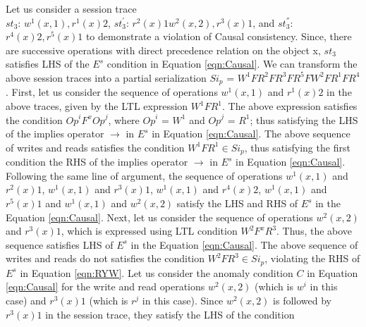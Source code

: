 \documentclass{sig-alternate-05-2015}
\begin{document}
 \par Let us consider a session trace \\ $\mathit{st}_3$: $w^1(x,1), r^1(x){2}$, $\mathit{st}_3^{'}$: $r^2(x){1} w^2(x,2), r^3(x){1}$, and $\mathit{st}_3^{''}$: $r^4(x){2}, r^5(x){1}$ to demonstrate
 a violation of Causal consistency. Since, there are successive operations with direct precedence relation on the object x, $\mathit{st}_3$
 satisfies LHS of the $E^s$ condition in Equation \ref{eqn:Causal}.  We can transform
 the above session traces into a partial serialization $\mathit{Si}_p$ =
 $W^1 F R^2 F R^3 F R^5 F W^2 F R^1 F R^4$. First, let us consider the sequence of operations
 $w^1(x,1)$ and $r^1(x){2}$ in the above traces, given by the LTL expression $W^1 F R^1$. The above expression satisfies
 the condition $\mathit{Op}^i F^x \mathit{Op}^j$, where $\mathit{Op}^i$ = $W^1$ and $\mathit{Op}^j$ = $R^1$;
 thus satisfying the LHS of the implies operator $\rightarrow$ in $E^s$ in Equation \ref{eqn:Causal}. The above sequence of
 writes and reads satisfies the condition $W^1 F R^1 \in \mathit{Si}_p$, thus satisfying the first condition the RHS of
 the implies operator $\rightarrow$ in $E^s$ in Equation \ref{eqn:Causal}.
 Following the same line of argument, the sequence of operations
  $w^1(x,1)$ and $r^2(x){1}$, $w^1(x,1)$ and $r^3(x){1}$, $w^1(x,1)$ and $r^4(x){2}$, $w^1(x,1)$ and $r^5(x){1}$
  and $w^1(x,1)$ and  $w^2(x,2)$ satisfy the LHS and RHS of $E^s$ in the Equation \ref{eqn:Causal}. Next, let us consider
  the sequence of operations $w^2(x,2)$ and $r^3(x){1}$, which is expressed using LTL condition $W^2 F^x R^3$.
  Thus, the above sequence satisfies LHS of $E^s$ in the Equation \ref{eqn:Causal}. The above sequence of
 writes and reads do not satisfies the condition $W^2 F R^3 \in \mathit{Si}_p$, violating the RHS of $E^s$ in Equation \ref{eqn:RYW}.
  Let us consider the anomaly condition $C$ in Equation \ref{eqn:Causal} for the write and read operations $w^2(x,2)$ (which is
  $w^i$ in this case) and $r^3(x){1}$ (which is $r^j$ in this case). Since  $w^2(x,2)$ is followed by $r^3(x){1}$ in the session trace, they satisfy the LHS of the condition
\end{document}
